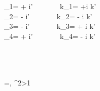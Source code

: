 

\\\\
{\omega_1}=  + \frac {\beta}{\left | \beta \right |} \sqrt {}i\omega'
 \ \ \ \ \ \ \ 
{k_1}= +\frac {\beta}{\left | \beta \right |}\sqrt {}i k'
\\
{\omega_2}=  - \frac {\beta}{\left | \beta \right |} \sqrt {}i\omega'
 \ \ \ \ \ \ \
{k_2}= - \frac {\beta}{\left | \beta \right |}\sqrt \frac{\beta+1}{\beta-1}i k'
\\
{\omega_3}=  - \frac {\beta}{\left | \beta \right |} \sqrt {}i\omega'
 \ \ \ \ \ \ \ 
{k_3}= + \frac {\beta}{\left | \beta \right |}\sqrt {}i k'
\\
{\omega_4}=  + \frac {\beta}{\left | \beta \right |} \sqrt {}i\omega'
 \ \ \ \ \ \ \
{k_4}= - \frac {\beta}{\left | \beta \right |}\sqrt {}i k'



\\\\
\\
\beta=, \beta^2\textgreater 1
